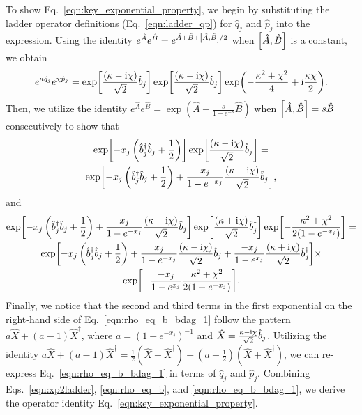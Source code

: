 \documentclass[preprint,aip,jcp]{revtex4-2}
\newcommand{\im}{\textup{i}}
\begin{document}
To show Eq.~\ref{eqn:key_exponential_property}, we begin by substituting the ladder operator definitions (Eq.~\ref{eqn:ladder_qp}) for $\hat{q}_j$ and $\hat{p}_j$ into the expression. Using the identity $e^{\hat{A}} e^{\hat{B}} = e^{\hat{A} + \hat{B} + \comm{\hat{A}}{\hat{B}}/2}$ when $\comm{\hat{A}}{\hat{B}}$ is a constant, we obtain
\begin{equation}\label{eqn:xp2ladder}
    e^{\kappa \hat{q}_j} e^{\chi \hat{p}_j} = \exp[\frac{(\kappa - \im \chi)}{\sqrt{2}}\hat{b}_j] \exp[\frac{(\kappa - \im \chi)}{\sqrt{2}}\hat{b}_j] \exp(-\frac{\kappa^2 + \chi^2}{4} + \im\frac{\kappa \chi}{2}).
\end{equation}
Then, we utilize the identity $e^{\hat{A}} e^{\hat{B}} = \exp(\hat{A} + \frac{s}{1 - e^{-s}} \hat{B})$ when $\comm{\hat{A}}{\hat{B}} = s\hat{B}$ consecutively to show that 
\begin{multline}\label{eqn:rho_eq_b}
    \exp[-x_j \left(\hat{b}_j^{\dagger}\hat{b}_j + \frac{1}{2}\right)] \exp[\frac{(\kappa - \im \chi)}{\sqrt{2}}\hat{b}_j] = \\ 
    \exp[-x_j \left(\hat{b}_j^{\dagger}\hat{b}_j + \frac{1}{2}\right) + \frac{x_j}{1 - e^{-x_j}} \frac{(\kappa - \im \chi)}{\sqrt{2}}\hat{b}_j], 
\end{multline}
and 
\begin{multline}\label{eqn:rho_eq_b_bdag_1}
    \exp[-x_j \left(\hat{b}_j^{\dagger}\hat{b}_j + \frac{1}{2}\right) + \frac{x_j}{1 - e^{-x_j}} \frac{(\kappa - \im \chi)}{\sqrt{2}}\hat{b}_j] \exp[\frac{(\kappa + \im \chi)}{\sqrt{2}}\hat{b}_j^{\dagger}] \exp[-\frac{\kappa^2 + \chi^2}{2 (1 - e^{-x_j})}]  = \\
    \exp[-x_j \left(\hat{b}_j^{\dagger}\hat{b}_j + \frac{1}{2}\right) + \frac{x_j}{1 - e^{-x_j}} \frac{(\kappa - \im \chi)}{\sqrt{2}}\hat{b}_j + \frac{-x_j}{1 - e^{x_j}} \frac{(\kappa + \im \chi)}{\sqrt{2}}\hat{b}_j^{\dagger}] \times\\ 
    \exp[- \frac{-x_j}{1 - e^{x_j}} \frac{\kappa^2 + \chi^2}{2 (1 - e^{-x_j})}].
\end{multline}
Finally, we notice that the second and third terms in the first exponential on the right-hand side of Eq.~\ref{eqn:rho_eq_b_bdag_1} follow the pattern $a \hat{X} + (a-1)\hat{X}^{\dagger}$, where $a = (1 - e^{-x_j})^{-1}$ and $\hat{X} = \frac{\kappa - \im\chi}{\sqrt{2}} \hat{b}_j$. Utilizing the identity $a \hat{X} + (a-1)\hat{X}^{\dagger} = \frac{1}{2}(\hat{X} - \hat{X}^{\dagger}) +  (a - \frac{1}{2}) (\hat{X} + \hat{X}^{\dagger})$,  we can re-express Eq.~\ref{eqn:rho_eq_b_bdag_1} in terms of $\hat{q}_j$ and $\hat{p}_j$. Combining Eqs.~\ref{eqn:xp2ladder}, \ref{eqn:rho_eq_b}, and \ref{eqn:rho_eq_b_bdag_1}, we derive the operator identity Eq.~\ref{eqn:key_exponential_property}.
\end{document}
